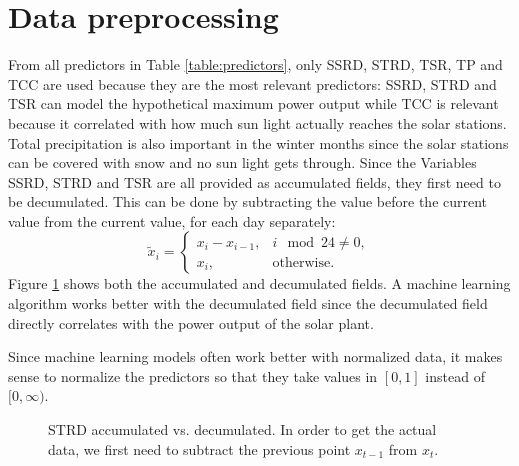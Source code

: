 \section{Data preprocessing}
\label{sec:data-preprocessing}

From all predictors in Table \ref{table:predictors}, only SSRD, STRD, TSR, TP and TCC are used 
because they are the most relevant predictors: SSRD, STRD and TSR can model the hypothetical maximum power 
output while TCC is relevant because it correlated with how much sun light actually reaches the solar stations. 
Total precipitation is also important in the winter months since the solar stations can be covered with snow and no sun light gets through.
Since the Variables SSRD, STRD and TSR are all provided as accumulated fields, they first need to be decumulated.
This can be done by subtracting the value before the current value from the current value, for each day separately: 
\[ \tilde{x}_i = \begin{cases}
    x_i - x_{i-1}, &i \mod 24 \neq 0, \\
    x_i, &\text{otherwise}.
\end{cases} \]
Figure \ref{fig:strd-accumulated-vs-decumulated} shows both the accumulated and decumulated fields. 
A machine learning algorithm works better with the decumulated field since the decumulated field directly correlates 
with the power output of the solar plant.

Since machine learning models often work better with normalized data, it makes sense to normalize the predictors 
so that they take values in \([0,1]\) instead of \([0,\infty)\). 

\begin{figure}[h]%
    \centering
    \qquad
    \caption[STRD accumulated vs. decumulated]{STRD accumulated vs. decumulated. 
    In order to get the actual data, we first need to subtract the previous point \(x_{t-1}\) from \(x_t\).}%
    \label{fig:strd-accumulated-vs-decumulated}%
\end{figure}